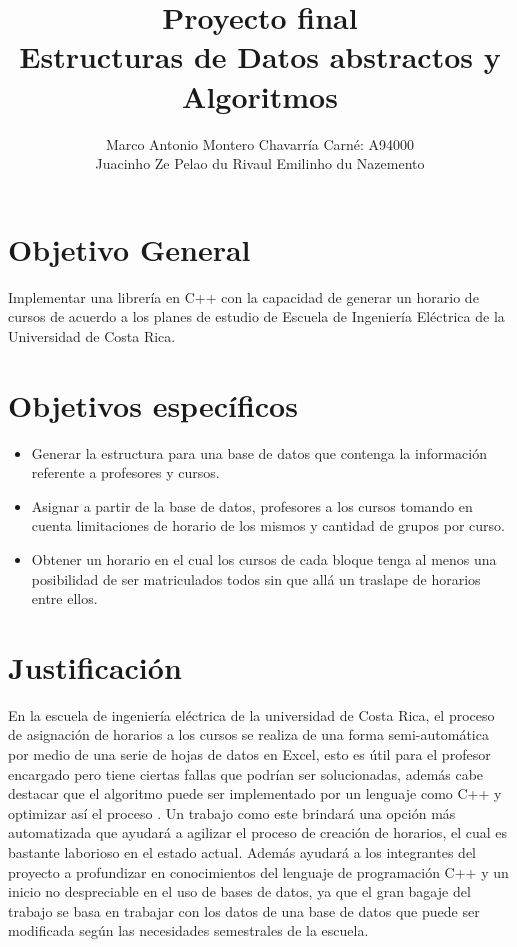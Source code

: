 \documentclass[letterpaper]{article}
\begin{document}
\title{Proyecto final\\Estructuras de Datos abstractos y Algoritmos}
\author{
 Marco Antonio Montero Chavarría Carné: A94000\\
 Juacinho Ze Pelao du Rivaul
 Emilinho du Nazemento
}
\maketitle

\newpage

\section*{Objetivo General}
Implementar una librería en C++ con la capacidad de generar un horario de cursos
de acuerdo a los planes de estudio de Escuela de Ingeniería Eléctrica de la
Universidad de Costa Rica.

\section*{Objetivos específicos}
\begin{itemize}
\item Generar la estructura para una base de datos que contenga la información referente a profesores y cursos.
\item Asignar a partir de la base de datos, profesores a los cursos tomando en cuenta limitaciones de horario de los mismos y cantidad de grupos por curso.
\item Obtener un horario en el cual los cursos de cada bloque tenga al menos una posibilidad de ser matriculados todos sin que allá un traslape de horarios entre ellos.

\end{itemize}


\section*{Justificación}
 En la escuela de ingeniería eléctrica de la universidad de Costa Rica, el proceso de asignación de horarios a los cursos se realiza de una forma semi-automática por medio de una serie de hojas de datos en Excel, esto es útil para el profesor encargado pero tiene ciertas fallas que podrían ser solucionadas, además cabe destacar que el algoritmo puede ser implementado por un lenguaje como C++ y optimizar así el proceso . Un trabajo como este brindará una opción más automatizada que ayudará a agilizar el proceso de creación de horarios, el cual es bastante laborioso en el estado actual. Además ayudará a los integrantes del proyecto a profundizar en conocimientos del lenguaje de programación C++ y un inicio no despreciable en el uso de bases de datos, ya que el gran bagaje del trabajo se basa en trabajar con los datos de una base de datos que puede ser modificada según las necesidades semestrales de la escuela.
\end{document}
